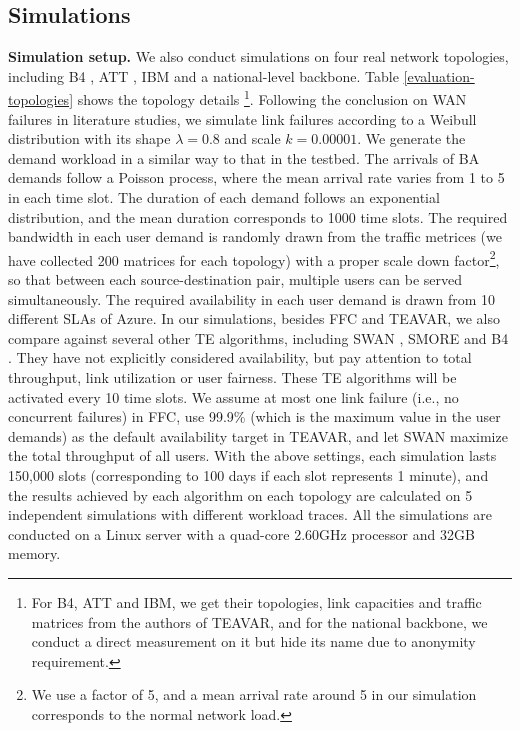 \documentclass[sigconf]{acmart}
\begin{document}
\subsection{Simulations}
\textbf{Simulation setup.} 
We also conduct simulations on four real network topologies, including B4 \cite{B4}, ATT \cite{Teavar}, IBM\cite{SMORE} and a national-level backbone. 
Table \ref{evaluation-topologies} shows the topology details
\footnote{For B4, ATT and IBM, we get their topologies, link capacities and traffic matrices from the authors of TEAVAR\cite{Teavar}, and for the national backbone, we conduct a direct measurement on it but hide its name due to anonymity requirement.}. 
Following the conclusion on WAN failures in literature studies\cite{Characterization, Teavar}, 
we simulate link failures according to a Weibull distribution with its shape $\lambda=0.8$ and scale $k=0.00001$. 
We generate the demand workload in a similar way to that in the testbed. 
The arrivals of BA demands follow a Poisson process, where the mean arrival rate varies from 1 to 5 in each time slot. 
The duration of each demand follows an exponential distribution, and the mean duration corresponds to 1000 time slots.
The required bandwidth in each user demand is randomly drawn from the traffic metrices (we have collected 200 matrices for each topology) with a proper scale down factor\footnote{We use a factor of 5, and a mean arrival rate around 5 in our simulation corresponds to the normal network load.}, so that between each source-destination pair, multiple users can be served simultaneously. 
The required availability in each user demand is drawn from 10 different SLAs of Azure\cite{azure}.
In our simulations, besides FFC and TEAVAR, we also compare against several other TE algorithms,  
including SWAN \cite{swan}, SMORE \cite{SMORE} and B4 \cite{B4}. 
They have not explicitly considered availability, but pay attention to 
total throughput, link utilization or user fairness. 
These TE algorithms will be activated every 10 time slots.
We assume at most one link failure (i.e., no concurrent failures) in FFC,  
use 99.9\% (which is the maximum value in the user demands) as the default availability target in TEAVAR,
and let SWAN maximize the total throughput of all users. 
With the above settings, each simulation lasts 150,000 slots (corresponding to 100 days if each slot represents 1 minute), and the results achieved by each algorithm on each topology are calculated on 5 independent simulations with different workload traces. 
All the simulations are conducted on a Linux server with a quad-core 2.60GHz processor and 32GB memory.
\end{document}
